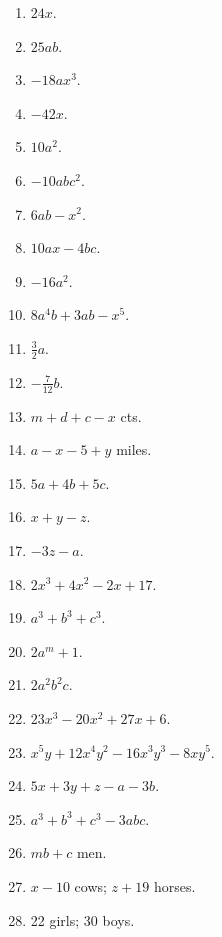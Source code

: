 \documentclass{book}
\begin{document}
\begin{enumerate}
\item $24x$.

\item $25ab$.

\item $-18ax^3$.

\item $-42x$.

\item $10a^2$.

\item $-10abc^2$.

\item $6ab-x^2$.

\item $10ax - 4bc$.

\item $-16a^2$.

\item $8a^4b + 3ab - x^5$.

\item $\frac{3}{2}a$.

\item $-\frac{7}{12}b$.

\item $m + d + c - x$ cts.

\item $a - x - 5 + y$ miles.

\item $5a + 4b + 5c$.

\item $x + y - z$.

\item $-3z - a$.

\item $2x^3 + 4x^2 - 2x + 17$.

\item $a^3 + b^3 + c^3$.

\item $2a^m + 1$.

\item $2a^2b^2c$.

\item $23x^3 - 20x^2 +  27x + 6$.

\item $x^5y + 12x^4y^2 - 16x^3y^3 - 8xy^5$.

\item $5x + 3y + z - a - 3b$.

\item $a^3 + b^3 + c^3 - 3abc$.

\item $mb + c$ men.

\item $x - 10$ cows; $z + 19$ horses.

\item 22 girls; 30 boys. \end{enumerate}
\end{document}
